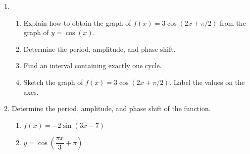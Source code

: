 \begin{enumerate}
\newpage

\item \begin{enumerate} \item Explain how to obtain the graph of $f(x)=3\cos(2x+\pi/2)$ from the graph of $y=\cos(x)$. \\[.75in]

\item Determine the period, amplitude, and phase shift.\\[1.5in]

\item Find an interval containing exactly one cycle.\vfill

\item Sketch the graph of $f(x)=3\cos(2x+\pi/2)$. Label the values on the axes.

    \noindent

\end{enumerate} 



\newpage



\item Determine the period, amplitude, and phase shift of the function. \begin{enumerate}
\item $f(x)= -2 \sin(3x-7)$ \\[1in] 
\item $y = \cos\left(\dfrac{\pi x}{3}+\pi\right)$ \\[1in]
\end{enumerate}



\end{enumerate}
